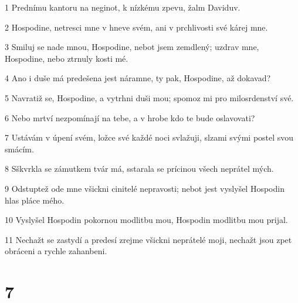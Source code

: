 \par 1 Prednímu kantoru na neginot, k nízkému zpevu, žalm Daviduv.
\par 2 Hospodine, netresci mne v hneve svém, ani v prchlivosti své kárej mne.
\par 3 Smiluj se nade mnou, Hospodine, nebot jsem zemdlený; uzdrav mne, Hospodine, nebo ztrnuly kosti mé.
\par 4 Ano i duše má predešena jest náramne, ty pak, Hospodine, až dokavad?
\par 5 Navratiž se, Hospodine, a vytrhni duši mou; spomoz mi pro milosrdenství své.
\par 6 Nebo mrtví nezpomínají na tebe, a v hrobe kdo te bude oslavovati?
\par 7 Ustávám v úpení svém, ložce své každé noci svlažuji, slzami svými postel svou smácím.
\par 8 Sškvrkla se zámutkem tvár má, sstarala se prícinou všech neprátel mých.
\par 9 Odstuptež ode mne všickni cinitelé nepravosti; nebot jest vyslyšel Hospodin hlas pláce mého.
\par 10 Vyslyšel Hospodin pokornou modlitbu mou, Hospodin modlitbu mou prijal.
\par 11 Nechažt se zastydí a predesí zrejme všickni neprátelé moji, nechažt jsou zpet obráceni a rychle zahanbeni.

\chapter{7}

